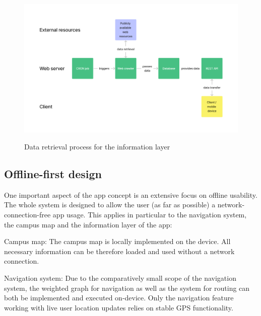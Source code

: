 \begin{figure}[H]
	\centering
	\includegraphics[width=1.0\textwidth]{images/data_retrieval_process.png}\\
	\caption{Data retrieval process for the information layer}
\end{figure}


\subsection{Offline-first design}
One important aspect of the app concept is an extensive focus on offline usability. The whole system is designed to allow the user (as far as possible) a network-connection-free app usage. This applies in particular to the navigation system, the campus map and the information layer of the app:

Campus map: The campus map is locally implemented on the device. All necessary information can be therefore loaded and used without a network connection.

Navigation system: Due to the comparatively small scope of the navigation system, the weighted graph for navigation as well as the system for routing can both be implemented and executed on-device. Only the navigation feature working with live user location updates relies on stable GPS functionality.

